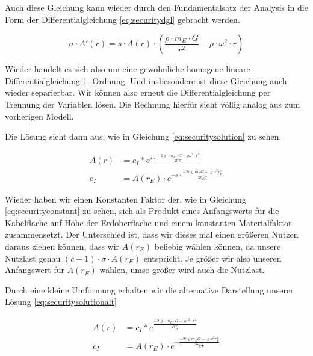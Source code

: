\documentclass[a4paper, 10pt]{report}
\begin{document}
Auch diese Gleichung kann wieder durch den Fundamentalsatz der Analysis in die Form der Differentialgleichung \ref{eq:securitydgl} gebracht werden.

\begin{equation}
\sigma \cdot A'(r) = s \cdot A(r) \cdot (\frac{\rho\cdot m_E \cdot G}{r^2} - \rho \cdot \omega^2 \cdot r)
\label{eq:securitydgl}
\end{equation}

Wieder handelt es sich also um eine gewöhnliche homogene lineare Differentialgleichung 1. Ordnung. Und insbesondere ist diese Gleichung auch wieder separierbar. Wir können also erneut die Differentialgleichung per Trennung der Variablen lösen. Die Rechnung hierfür sieht völlig analog aus zum vorherigen Modell.


Die Lösung sieht dann aus, wie in Gleichung \ref{eq:securitysolution} zu sehen.

\begin{align}
A(r) &= c_I * e^{s \cdot \frac{-2\varrho \cdot m_E \cdot G - \rho \omega^2 \cdot r^3}{2 r \sigma}}\label{eq:securitysolution}\\
c_I &= A(r_E) \cdot e^{- s \cdot \frac{-2 c \varrho m_E G - \varrho \omega^2 r_E^3}{2 r_E \sigma}}
\label{eq:securityconstant}
\end{align}

Wieder haben wir einen Konstanten Faktor der, wie in Gleichung \ref{eq:securityconstant} zu sehen, sich als Produkt eines Anfangswerts für die Kabelfläche auf Höhe der Erdoberfläche und einem konstanten Materialfaktor zusammensetzt. Der Unterschied ist, dass wir dieses mal einen größeren Nutzen daraus ziehen können, dass wir $A(r_E)$ beliebig wählen können, da unsere Nutzlast genau $(c-1)\cdot \sigma \cdot A(r_E)$ entspricht. Je größer wir also unseren Anfangswert für $A(r_E)$ wählen, umso größer wird auch die Nutzlast.

Durch eine kleine Umformung erhalten wir die alternative Darstellung unserer Lösung \ref{eq:securitysolutionalt}

\begin{align}
A(r) &= c_I * e^{\frac{-2\varrho \cdot m_E \cdot G - \rho \omega^2 \cdot r^3}{2 r \frac{\sigma}{s}}}\label{eq:securitysolutionalt}\\
c_I &= A(r_E) \cdot e^{- \frac{-2 c \varrho m_E G - \varrho \omega^2 r_E^3}{2 r_E \frac{\sigma}{s}}}
\label{eq:securityconstantalt}
\end{align}
\end{document}
